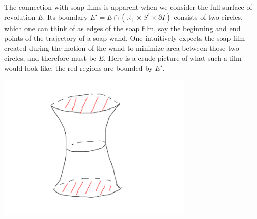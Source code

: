 \documentclass[10pt]{article}
\newcommand{\RR}{\mathbb{R}}
\theoremstyle{definition}
\begin{document}
The connection with soap films is apparent when we consider the full surface of revolution $E$. Its boundary $E' = E \cap (\RR_+ \times S^1 \times \partial I)$ consists of two circles, which one can think of as edges of the soap film, say the beginning and end points of the trajectory of a soap wand.
One intuitively expects the soap film created during the motion of the wand to minimize area between those two circles, and therefore must be $E$.
Here is a crude picture of what such a film would look like: the red regions are bounded by $E'$.

\includegraphics[width=0.7\textwidth]{felm_1soap.png}
\end{document}
